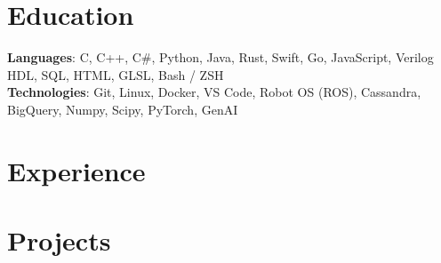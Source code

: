 \documentclass[letterpaper,11pt]{article}
\begin{document}


\section{Education}
    \resumeSubHeadingListStart
        
    \resumeSubHeadingListEnd

\begin{itemize}[leftmargin=0.15in, label={}]
    \small{\item{
        \textbf{Languages}{: C, C++, C\#, Python, Java, Rust, Swift, Go, JavaScript, Verilog HDL, SQL, HTML, GLSL, Bash / ZSH} \\
        \textbf{Technologies}{: Git, Linux, Docker, VS Code, Robot OS (ROS), Cassandra, BigQuery, Numpy, Scipy, PyTorch, GenAI} \\
    }}
\end{itemize}

\section{Experience}
    \resumeSubHeadingListStart
        
        
        
        
    \resumeSubHeadingListEnd

\section{Projects}
    \resumeSubHeadingListStart
        

        
    \resumeSubHeadingListEnd
\end{document}
